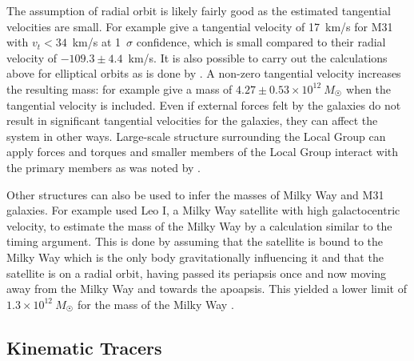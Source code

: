 \documentclass[english, oneside]{HYgradu}
\begin{document}
The assumption of radial orbit is likely fairly good as the estimated tangential velocities are small. For example \citet{vandermarel2012m31} give a tangential velocity of 17~km/s for M31 with $v_{t} < 34$~km/s at 1~$\sigma$ confidence, which is small compared to their radial velocity of $-109.3 \pm 4.4$~km/s. It is also possible to carry out the calculations above for elliptical orbits as is done by \citet{einasto1982mass}. A non-zero tangential velocity increases the resulting mass: for example \citet{vandermarel2012m31} give a mass of $4.27 \pm 0.53 \times 10^{12}~M_{\astrosun}$ when the tangential velocity is included. Even if external forces felt by the galaxies do not result in significant tangential velocities for the galaxies, they can affect the system in other ways. Large-scale structure surrounding the Local Group can apply forces and torques and smaller members of the Local Group interact with the primary members as was noted by \citet{kahn1959intergalactic}.

Other structures can also be used to infer the masses of Milky Way and M31 galaxies. For example \citet{zaritsky1989velocities} used Leo I, a Milky Way satellite with high galactocentric velocity, to estimate the mass of the Milky Way by a calculation similar to the timing argument. This is done by assuming that the satellite is bound to the Milky Way which is the only body gravitationally influencing it and that the satellite is on a radial orbit, having passed its periapsis once and now moving away from the Milky Way and towards the apoapsis. This yielded a lower limit of $1.3 \times 10^{12}~M_{\astrosun}$ for the mass of the Milky Way \citep{zaritsky1989velocities}.

\subsection{Kinematic Tracers}

\end{document}
